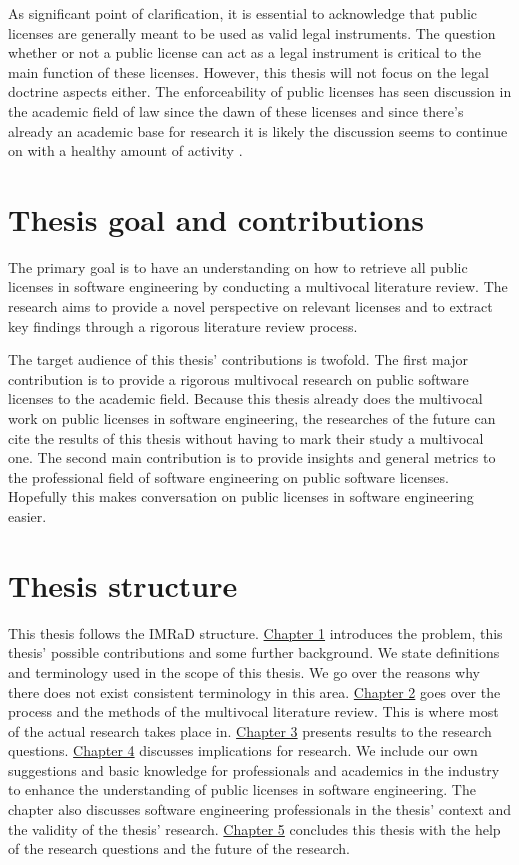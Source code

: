 As significant point of clarification, it is essential to acknowledge that public licenses are generally meant to be used as valid legal instruments. The question whether or not a public license can act as a legal instrument is critical to the main function of these licenses. However, this thesis will not focus on the legal doctrine aspects either. The enforceability of public licenses has seen discussion in the academic field of law since the dawn of these licenses and since there's already an academic base for research it is likely the discussion seems to continue on with a healthy amount of activity \citep{duisburg2011gpl}.

\section{Thesis goal and contributions}
The primary goal is to have an understanding on how to retrieve all public licenses in software engineering by conducting a multivocal literature review. The research aims to provide a novel perspective on relevant licenses and to extract key findings through a rigorous literature review process.

The target audience of this thesis' contributions is twofold. The first major contribution is to provide a rigorous multivocal research on public software licenses to the academic field. Because this thesis already does the multivocal work on public licenses in software engineering, the researches of the future can cite the results of this thesis without having to mark their study a multivocal one. The second main contribution is to provide insights and general metrics to the professional field of software engineering on public software licenses. Hopefully this makes conversation on public licenses in software engineering easier.

\section{Thesis structure}
This thesis follows the IMRaD structure. \hyperref[intro]{Chapter 1} introduces the problem, this thesis' possible contributions and some further background. We state definitions and terminology used in the scope of this thesis. We go over the reasons why there does not exist consistent terminology in this area. \hyperref[methods]{Chapter 2} goes over the process and the methods of the multivocal literature review. This is where most of the actual research takes place in. \hyperref[results]{Chapter 3} presents results to the research questions. \hyperref[discussion]{Chapter 4} discusses implications for research. We include our own suggestions and basic knowledge for professionals and academics in the industry to enhance the understanding of public licenses in software engineering. The chapter also discusses software engineering professionals in the thesis' context and the validity of the thesis' research. \hyperref[conclusions]{Chapter 5} concludes this thesis with the help of the research questions and the future of the research.
